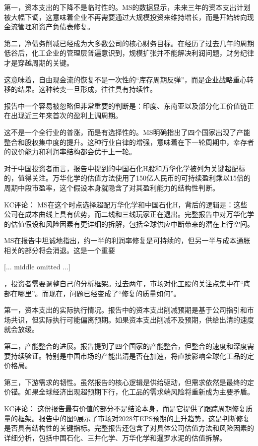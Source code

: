 \documentclass[11pt]{ctexart}
\begin{document}
第一，资本支出的下降不是临时性的。MS的数据显示，未来三年的资本支出计划被大幅下调，这意味着企业不再需要通过大规模投资来维持增长，而是开始转向现金流管理和资产负债表修复。

第二，净债务削减已经成为大多数公司的核心财务目标。在经历了过去几年的周期低谷后，化工企业的管理层普遍意识到，规模扩张并不能解决利润问题，财务纪律才是穿越周期的关键。

这意味着，自由现金流的恢复不是一次性的“库存周期反弹”，而是企业战略重心转移的结果。这种转变一旦形成，往往具有持续性。

报告中一个容易被忽略但非常重要的判断是：印度、东南亚以及部分化工价值链正在出现近三年来首次的盈利上调周期。

这不是一个全行业的普涨，而是有选择性的。MS明确指出了四个国家出现了产能整合和股权集中度的提升。这种行业自律的增强，意味着在下一轮周期中，幸存者的议价能力和利润率结构都会优于上一轮。

对于中国投资者而言，报告中提到的中国石化H股和万华化学被列为关键超配标的，值得关注。万华化学的估值方法使用了150亿人民币的可持续盈利乘以15倍的周期中段市盈率，这个假设本身就隐含了对其盈利能力的结构性判断。

KC评论： MS在这个时点选择超配万华化学和中国石化H，背后的逻辑是：这些公司在成本曲线上具有优势，而二线和三线玩家正在退出。完整报告中对万华化学的估值假设和风险因素有更详细的拆解，包括全球供应中断带来的潜在上行空间。

MS在报告中坦诚地指出，约一半的利润率修复是可持续的，但另一半与成本通胀相关的部分将会消退。这是一个重要

[... middle omitted ...]

，投资者需要调整自己的分析框架。过去两年，市场对化工股的关注点集中在“底部在哪里”。而现在，问题已经变成了“修复的质量如何”。

第一，资本支出的实际执行情况。报告中的资本支出削减预期是基于公司指引和市场共识，但实际执行可能偏离预期。如果资本支出削减不及预期，供给出清的速度就会放缓。

第二，产能整合的进展。报告提到了四个国家的产能整合，但整合的速度和深度需要持续验证。特别是中国市场的产能出清是否在加速，将直接影响全球化工品的定价格局。

第三，下游需求的韧性。虽然报告的核心逻辑是供给驱动，但需求依然是最终的定价锚。如果全球经济出现超预期下行，化工品的需求端风险将重新成为主要矛盾。

KC评论： 这份报告最有价值的部分不是结论本身，而是它提供了跟踪周期修复质量的框架。报告中的图9展示了市场对2028年EPS预期的上升趋势，这是判断修复是否具有结构性的关键指标。完整报告还包含了对具体公司估值方法和风险因素的详细分析，包括中国石化、三井化学、万华化学和暹罗水泥的估值拆解。
\end{document}

